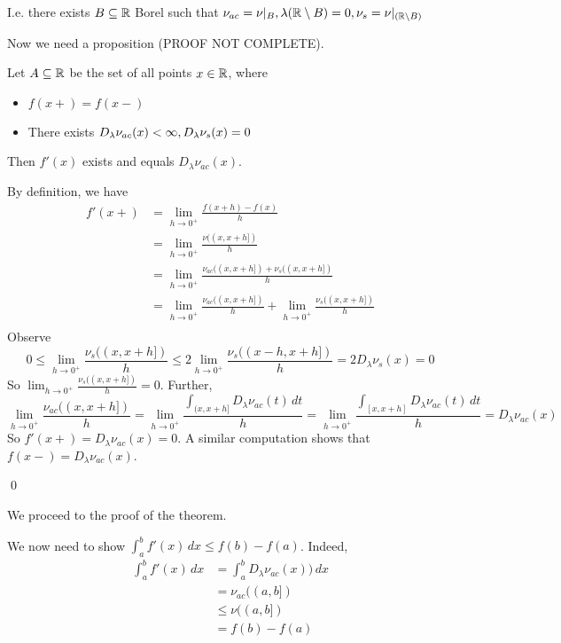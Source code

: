 \documentclass[x11names,reqno,14pt]{extarticle}
\begin{document}
I.e. there exists $B \subseteq \mathbb{R}$ Borel such that $\nu_{ac} = \nu|_B, \lambda(\mathbb{R}\setminus B) = 0, \nu_s = \nu|_{(\mathbb{R}\setminus B)}$

Now we need a proposition (PROOF NOT COMPLETE). 

\prop Let $A \subseteq \mathbb{R}$ be the set of all points $x \in \mathbb{R}$, where 
\begin{itemize}

\item $f(x+) = f(x-)$ 

\item There exists $D_\lambda\nu_{ac}(x)<\infty, D_\lambda\nu_s(x) = 0$

\end{itemize}

Then $f'(x)$ exists and equals $D_\lambda\nu_{ac}(x)$. 

\proof

By definition, we have
\begin{align*}
f'(x+) & = \lim_{h\to0^+}\frac{f(x + h) - f(x)}{h} \\ 
&  = \lim_{h\to0^+} \frac{\nu((x, x + h])}{h} \\ 
& = \lim_{h\to0^+} \frac{\nu_{ac}((x, x + h]) + \nu_s((x, x + h])}{h} \\
& = \lim_{h\to0^+}\frac{\nu_{ac}((x, x + h])}{h} + \lim_{h\to0^+}\frac{\nu_s((x, x + h])}{h} \\
\end{align*}
Observe 
\[
0\leq\lim_{h\to0^+}\frac{\nu_s((x, x + h])}{h} \leq 2\lim_{h\to0^+}\frac{\nu_s((x - h, x + h])}{h} = 2D_\lambda\nu_s(x) = 0
\]
So $\lim_{h\to0^+}\frac{\nu_s((x, x + h])}{h} = 0$. Further, 
\[
\lim_{h\to0^+}\frac{\nu_{ac}((x, x + h])}{h} = \lim_{h\to0^+}\frac{\int_{(x, x + h]}D_\lambda\nu_{ac}(t)\,dt}{h} = \lim_{h\to0^+}\frac{\int_{[x, x + h]}D_\lambda\nu_{ac}(t)\,dt}{h} = D_\lambda\nu_{ac}(x)
\]
So $f'(x+) = D_\lambda\nu_{ac}(x) = 0$. A similar computation shows that $f(x-) = D_\lambda\nu_{ac}(x)$.

\qed

We proceed to the proof of the theorem. 

\proof

We now need to show $\int_a^bf'(x)\,dx \leq f(b) - f(a)$. Indeed, 
\begin{align*}
\int_a^bf'(x)\,dx & = \int_a^bD_\lambda\nu_{ac}(x))\,dx \\ 
& = \nu_{ac}((a, b]) \\
& \leq \nu((a, b]) \\
& = f(b) - f(a) \\
\end{align*}
\end{document}
